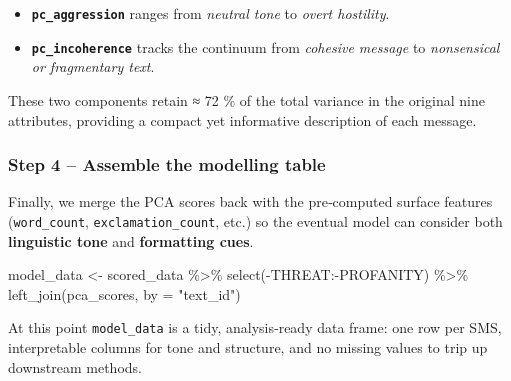 \documentclass[
  letterpaper,
  DIV=11,
  numbers=noendperiod]{scrartcl}
\newenvironment{Shaded}{\begin{snugshade}}{\end{snugshade}}
\newcommand{\AttributeTok}[1]{\textcolor[rgb]{0.40,0.45,0.13}{#1}}
\newcommand{\CommentTok}[1]{\textcolor[rgb]{0.37,0.37,0.37}{#1}}
\newcommand{\FunctionTok}[1]{\textcolor[rgb]{0.28,0.35,0.67}{#1}}
\newcommand{\NormalTok}[1]{\textcolor[rgb]{0.00,0.23,0.31}{#1}}
\newcommand{\OtherTok}[1]{\textcolor[rgb]{0.00,0.23,0.31}{#1}}
\newcommand{\SpecialCharTok}[1]{\textcolor[rgb]{0.37,0.37,0.37}{#1}}
\newcommand{\StringTok}[1]{\textcolor[rgb]{0.13,0.47,0.30}{#1}}
\providecommand{\tightlist}{%
  \setlength{\itemsep}{0pt}\setlength{\parskip}{0pt}}\usepackage{longtable,booktabs,array}
\begin{document}
\begin{tcolorbox}
\begin{Shaded}
\end{Shaded}

\begin{itemize}
\tightlist
\item
  \textbf{\texttt{pc\_aggression}} ranges from \emph{neutral tone} to
  \emph{overt hostility}.
\item
  \textbf{\texttt{pc\_incoherence}} tracks the continuum from
  \emph{cohesive message} to \emph{nonsensical or fragmentary text}.
\end{itemize}

These two components retain ≈ 72 \% of the total variance in the
original nine attributes, providing a compact yet informative
description of each message.

\subsubsection{Step 4 -- Assemble the modelling
table}\label{step-4-assemble-the-modelling-table}

Finally, we merge the PCA scores back with the pre‑computed surface
features (\texttt{word\_count}, \texttt{exclamation\_count}, etc.) so
the eventual model can consider both \textbf{linguistic tone} and
\textbf{formatting cues}.

\begin{Shaded}
\begin{Highlighting}[]
\NormalTok{model\_data }\OtherTok{\textless{}{-}}\NormalTok{ scored\_data }\SpecialCharTok{\%\textgreater{}\%}
  \FunctionTok{select}\NormalTok{(}\SpecialCharTok{{-}}\NormalTok{THREAT}\SpecialCharTok{:{-}}\NormalTok{PROFANITY) }\SpecialCharTok{\%\textgreater{}\%}
  \FunctionTok{left\_join}\NormalTok{(pca\_scores, }\AttributeTok{by =} \StringTok{"text\_id"}\NormalTok{)}
\end{Highlighting}
\end{Shaded}

At this point \texttt{model\_data} is a tidy, analysis‑ready data frame:
one row per SMS, interpretable columns for tone and structure, and no
missing values to trip up downstream methods.

\end{tcolorbox}
\end{document}

